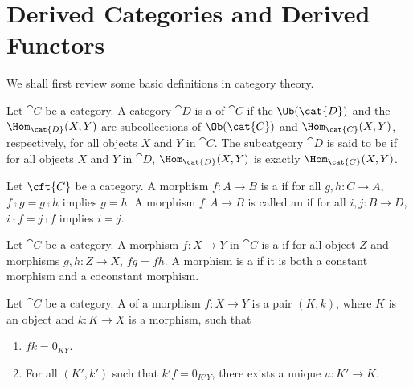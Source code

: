 \pagebreak
\section{Derived Categories and Derived Functors}
\par
We shall first review some basic definitions in category theory.
\begin{definition}
    Let $\cat{C}$ be a category. A category $\cat{D}$ is a  of $\cat{C}$ if the $\Ob(\cat{D})$ and the ${\Hom}_{\cat{D}}(X,Y)$ are subcollections of $\Ob(\cat{C})$ and ${\Hom}_{\cat{C}}(X,Y)$, respectively, for all objects $X$ and $Y$ in $\cat{C}$. The subcatgeory $\cat{D}$ is said to be  if for all objects $X$ and $Y$ in $\cat{D}$, ${\Hom}_{\cat{D}}(X,Y)$ is exactly ${\Hom}_{\cat{C}}(X,Y)$.
\end{definition}
\begin{definition}
    Let $\cft{C}$ be a category. A morphism $f:A\to B$ is a  if for all $g,h:C\to A$, $f\comp g=g\comp h$ implies $g=h$. A morphism $f:A\to B$ is called an  if for all $i,j:B\to D$, $i\comp f=j\comp f$ implies $i=j$.
\end{definition}
\begin{definition}
    Let $\cat{C}$ be a category. A morphism $f:X\to Y$ in $\cat{C}$ is a  if for all object $Z$ and morphisms $g,h:Z\to X$, $fg=fh$. A morphism is a  if it is both a constant morphism and a coconstant morphism.
\end{definition}
\begin{definition}
    Let $\cat{C}$ be a category. A  of a morphism $f:X\to Y$ is a pair $(K,k)$, where $K$ is an object and $k:K\to X$ is a morphism, such that 
    \begin{enumerate}
        \item $fk={0}_{KY}$.
        \item For all $(K',k')$ such that $k'f={0}_{K'Y}$, there exists a unique $u:K'\to K$.
    \end{enumerate}
    \begin{center}
    \end{center}
\end{definition}

